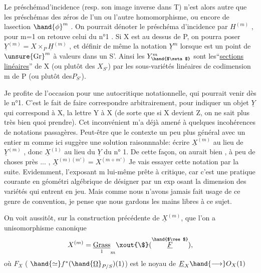 
Le préschémad'incidence  (resp. son image inverse dans T) n'est alors
autre que les préschémas des zéros de l'un ou l'autre homomorphisme,
ou encore de lasection $\hand{\phi}^{m}$ .  On pourrait dénoter le préschéma
d'incidence par $H^{(m)}$ , pour m=1 on retouve celui du n°1 .  Si X est
au dessus de P, on pourra poser $\underline{Y}^{(m)} = X\times_{P} \underline{H}^{(m)}$ ,  et définir de même
la notation $\underline{Y}^{m}$ lorsque \hand{$\zeta$} est un point de $\unsure{\mathrm{Gr}}^{m}$ à valeurs dans un S'.
Ainsi les  $Y^{m}_{\hand{$\zeta$}}$  sont les``\uline{sections} \uline{linéaires}''  de X  (ou plutôt des
$X_{S'}$)   par les sous-variétés linéaires de codimension m de P (ou
plutôt des$P_{S'}$).

\margin{$|$}Je profite de l'occasion pour une  autocritique notationnelle,
qui pourrait venir dès le n°1. C'est le fait  de faire correspondre
arbitrairement, pour indiquer un objet $\underline{Y}$ qui correspond à X, la lettre
Y à X  (de sorte que si X devient Z, on ne sait plus très bien quoi
prendre). Cet inconvénient m'a déjà amené à quelques incohérences de
notations passagères.  Peut-être que le contexte un peu plus général
avec un entier m comme ici suggère une solution raisonnnable: écrire
$\underline{X}^{(m)}$ au lieu de  $\underline{Y}^{(m)}$ , donc  $\underline{X}^{(1)}$ au lieu du  $\underline{Y}$  du n° 1. De cette
façon, on  aurait bien , à peu de choses près ... ,  $\underline{X}^{(m)(m')} = X^{(m+m')}$
Je vais essayer cette notation par la suite.  Evidemment, l'exposant m
lui-même prête à critique, car  c'est une pratique courante en géométri
algébrique de désigner par un exp osant la dimension des variétés qui
entrent en jeu. Mais comme nous n'avons jamais fait usage de ce genre
de convention, je pense que nous gardons les mains libres à ce sujet.

On voit aussitôt, sur la construction précédente de $\underline{X}^{(m)}$, que
l'on a unisomorphisme canonique
\[ X^{(m)} = \underset{1}{\underline{\mathrm{Grass}}}_{m}\xout{\$}(\overset{\hand{$\vee$}}{\underline{F}}) , \]
où  $F_{X}$  ( $\hand{\simeq} f^{*}(\hand{\underline{\Omega}}_{P/S})(1)$)   est le noyau de  $\underline{E}_{X} \hand{\longrightarrow} O_{X}(1)$\hand{,}

